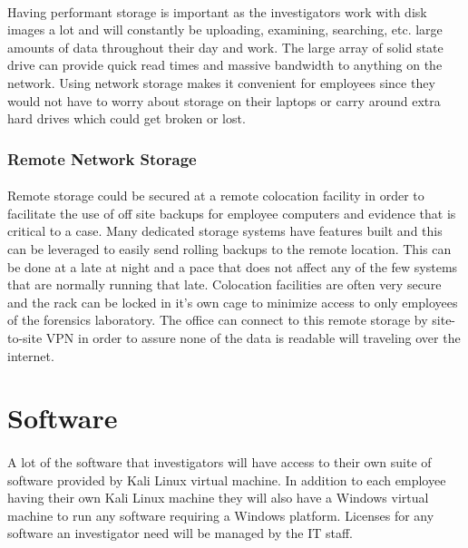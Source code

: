 \documentclass{article}
\begin{document}
\paragraph{}
Having performant storage is important as the investigators work with disk images a lot and will constantly be uploading, examining, searching, etc.  large amounts of data throughout their day and work.
The large array of solid state drive can provide quick read times and massive bandwidth to anything on the network.
Using network storage makes it convenient for employees since they would not have to worry about storage on their laptops or carry around extra hard drives which could get broken or lost.


\subsubsection{Remote Network Storage}
\paragraph{}
Remote storage could be secured at a remote colocation facility in order to facilitate the use of off site backups for employee computers and evidence that is critical to a case. 
Many dedicated storage systems have features built and this can be leveraged to easily send rolling backups to the remote location. 
This can be done at a late at night and a pace that does not affect any of the few systems that are normally running that late. 
Colocation facilities are often very secure and the rack can be locked in it's own cage to minimize access to only employees of the forensics laboratory. 
The office can connect to this remote storage by site-to-site VPN in order to assure none of the data is readable will traveling over the internet. 

\section{Software}
\paragraph{}
A lot of the software that investigators will have access to their own suite of software provided by Kali Linux virtual machine. In addition to each employee having their own Kali Linux machine they will also have a Windows virtual machine to run any software requiring a Windows platform. Licenses for any software an investigator need will be managed by the IT staff. 
\end{document}
